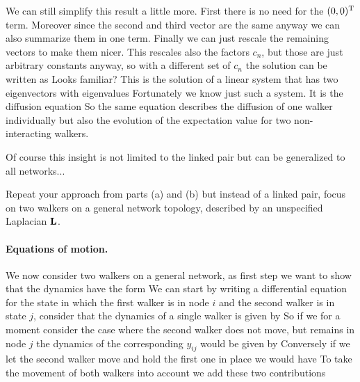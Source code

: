 We can still simplify this result a little more. First there is no need for the $(0,0)^{\rm T}$ term. Moreover since the second and third vector are the same anyway we can also summarize them in one term. Finally we can just rescale the remaining vectors to make them nicer. This rescales also the factors $c_n$, but those are just arbitrary constants anyway, so with a different set of $c_n$ the solution can be written as 
Looks familiar? This is the solution of a linear system that has two eigenvectors
with eigenvalues 
Fortunately we know just such a system. It is the diffusion equation 
So the same equation describes the diffusion of  one walker individually but also the evolution of the expectation value for two non-interacting walkers. 

Of course this insight is not limited to the linked pair but can be generalized to all networks...

\subquestion 
Repeat your approach from parts (a) and (b) but instead of a linked pair, focus on two walkers on a general network topology, described by an unspecified Laplacian $\bf L$.

\solution
\paragraph{Equations of motion. }We now consider two walkers on a general network, as first step we want to show that the dynamics have the form 
We can start by writing a differential equation for the state in which the first walker is in node $i$ and the second walker is in state $j$, consider that the dynamics of a single walker is given by
So if we for a moment consider the case where the second walker does not move, but remains in node $j$ the dynamics of the corresponding $y_{ij}$ would be given by 
Conversely if we let the second walker move and hold the first one in place we would have 
To take the movement of both walkers into account we add these two contributions

